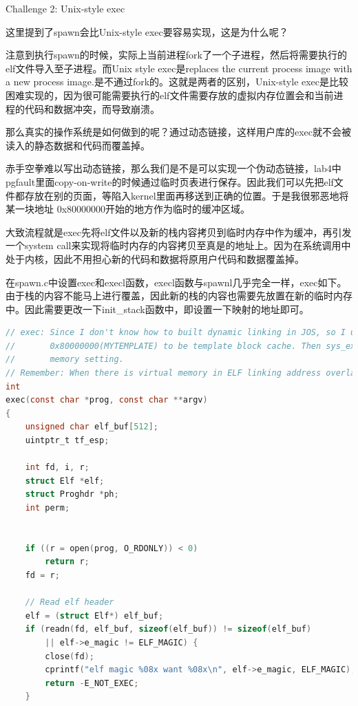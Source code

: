 \documentclass[GBK,winfonts,a4paper,10pt]{ctexart}
\begin{document}
\begin{section}{ \textcolor[rgb]{1.00,0.00,0.00}{Challenge 2: Unix-style exec} }
\par
\textcolor[rgb]{1.00,0.00,0.00}{这里提到了spawn会比Unix-style exec要容易实现，这是为什么呢？}
\par
注意到执行spawn的时候，实际上当前进程fork了一个子进程，然后将需要执行的elf文件导入至子进程。而Unix style exec是replaces the current process image with a new process image.是不通过fork的。这就是两者的区别，Unix-style exec是比较困难实现的，因为很可能需要执行的elf文件需要存放的虚拟内存位置会和当前进程的代码和数据冲突，而导致崩溃。
\par
那么真实的操作系统是如何做到的呢？通过动态链接，这样用户库的exec就不会被读入的静态数据和代码而覆盖掉。
\par
\par
赤手空拳难以写出动态链接，那么我们是不是可以实现一个伪动态链接，lab4中pgfault里面copy-on-write的时候通过临时页表进行保存。因此我们可以先把elf文件都存放在别的页面，等陷入kernel里面再移送到正确的位置。于是我很邪恶地将某一块地址 0x80000000开始的地方作为临时的缓冲区域。
\par
大致流程就是exec先将elf文件以及新的栈内容拷贝到临时内存中作为缓冲，再引发一个system call来实现将临时内存的内容拷贝至真是的地址上。因为在系统调用中处于内核，因此不用担心新的代码和数据将原用户代码和数据覆盖掉。
\par
在spawn.c中设置exec和execl函数，execl函数与spawnl几乎完全一样，exec如下。由于栈的内容不能马上进行覆盖，因此新的栈的内容也需要先放置在新的临时内存中。因此需要更改一下init\_stack函数中，即设置一下映射的地址即可。
\begin{lstlisting}[language = C]
// exec: Since I don't know how to built dynamic linking in JOS, so I use virtual address that starts from 
// 		 0x80000000(MYTEMPLATE) to be template block cache. Then sys_exec is a system call to complete 
// 		 memory setting.
// Remember: When there is virtual memory in ELF linking address overlaped with MYTEMPLATE, exec will fail.
int
exec(const char *prog, const char **argv)
{
	unsigned char elf_buf[512];
	uintptr_t tf_esp;

	int fd, i, r;
	struct Elf *elf;
	struct Proghdr *ph;
	int perm;	


	if ((r = open(prog, O_RDONLY)) < 0)
		return r;
	fd = r;

	// Read elf header
	elf = (struct Elf*) elf_buf;
	if (readn(fd, elf_buf, sizeof(elf_buf)) != sizeof(elf_buf)
	    || elf->e_magic != ELF_MAGIC) {
		close(fd);
		cprintf("elf magic %08x want %08x\n", elf->e_magic, ELF_MAGIC);
		return -E_NOT_EXEC;
	}



\end{lstlisting}
\end{section}
\end{document}
